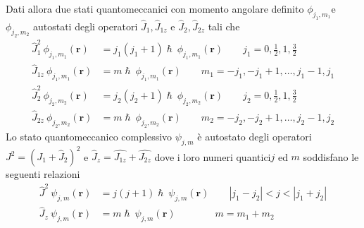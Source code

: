 Dati allora due stati quantomeccanici con momento angolare definito
\(\phi_{j_{1},m_{1}}\)e \(\phi_{j_{2},m_{2}}\) autostati degli operatori
\(\hat{J}_{1},\hat{J}_{1z}\) e \(\hat{J}_{2}, \hat{J}_{2z}\) tali che
\begin{equation}
    \begin{aligned}
        \hat{J}_{1}^{2} \ \phi_{j_{1},m_{1}}(\bm{r}) &= j_{1}(j_{1}+1) \hslash \ \phi_{j_{1},m_{1}}(\bm{r}) \qquad j_{1} = 0, \frac{1}{2}, 1, \frac{3}{2}\\
        \hat{J}_{1z} \ \phi_{j_{1},m_{1}}(\bm{r}) &= m \hslash \ \phi_{j_{1},m_{1}}(\bm{r})  \qquad m_{1} = -j_{1} , -j_{1} +1, \dots , j_{1}-1, j_{1}
    \end{aligned}
    \label{eq:angular-momentum-theorem-1}
\end{equation}
\begin{equation}
    \begin{aligned}
        \hat{J}_{2}^{2} \ \phi_{j_{2},m_{2}}(\bm{r}) &= j_{2}(j_{2}+1) \hslash \ \phi_{j_{2},m_{2}}(\bm{r}) \qquad j_{2} = 0, \frac{1}{2}, 1, \frac{3}{2}\\
        \hat{J}_{2z} \ \phi_{j_{2},m_{2}}(\bm{r}) &= m \hslash \ \phi_{j_{2},m_{2}}(\bm{r})  \qquad m_{2} = -j_{2} , -j_{2} +1, \dots , j_{2}-1, j_{2}
    \end{aligned}
    \label{eq:angular-momentum-theorem-2}
\end{equation}
Lo stato quantomeccanico complessivo \(\psi_{j,m}\) è autostato degli
operatori \(J^{2} = (J_{1} + \hat{J}_{2})^{2}\) e
\(\hat{J}_{z} = \hat{J_{1z}} + \hat{J_{2z}}\) dove i loro numeri
quantici\(j\) ed \(m\) soddisfano le seguenti relazioni
\begin{equation}
    \begin{aligned}
        \hat{J}^{2} \ \psi_{j,m}(\bm{r}) &= j(j+1) \hslash \ \psi_{j,m}(\bm{r}) \qquad | j_{1} - j_{2}|<j<|j_{1}+j_{2}|\\
        \hat{J}_{z} \ \psi_{j,m}(\bm{r}) &= m \hslash \ \psi_{j,m}(\bm{r})  \qquad \qquad m = m_{1}+m_{2}
    \end{aligned}
    \label{eq:angular-momentum-theorem-3}
\end{equation}
\bigskip

